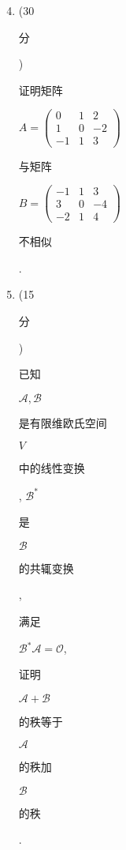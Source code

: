\documentclass[10pt]{article}
\begin{document}
\begin{enumerate}
  \setcounter{enumi}{3}
  \item (30 \begin{CJK}{UTF8}{mj}分\end{CJK}) \begin{CJK}{UTF8}{mj}证明矩阵\end{CJK} $A=\left(\begin{array}{rrr}0 & 1 & 2 \\ 1 & 0 & -2 \\ -1 & 1 & 3\end{array}\right)$ \begin{CJK}{UTF8}{mj}与矩阵\end{CJK} $B=\left(\begin{array}{rrr}-1 & 1 & 3 \\ 3 & 0 & -4 \\ -2 & 1 & 4\end{array}\right)$ \begin{CJK}{UTF8}{mj}不相似\end{CJK}.

  \item (15 \begin{CJK}{UTF8}{mj}分\end{CJK}) \begin{CJK}{UTF8}{mj}已知\end{CJK} $\mathscr{A}, \mathscr{B}$ \begin{CJK}{UTF8}{mj}是有限维欧氏空间\end{CJK} $V$ \begin{CJK}{UTF8}{mj}中的线性变换\end{CJK}, $\mathscr{B}^{*}$ \begin{CJK}{UTF8}{mj}是\end{CJK} $\mathscr{B}$ \begin{CJK}{UTF8}{mj}的共辄变换\end{CJK}, \begin{CJK}{UTF8}{mj}满足\end{CJK} $\mathscr{B}{ }^{*} \mathscr{A}=\mathscr{O}$, \begin{CJK}{UTF8}{mj}证明\end{CJK} $\mathscr{A}+\mathscr{B}$ \begin{CJK}{UTF8}{mj}的秩等于\end{CJK} $\mathscr{A}$ \begin{CJK}{UTF8}{mj}的秩加\end{CJK} $\mathscr{B}$ \begin{CJK}{UTF8}{mj}的秩\end{CJK}.


\end{enumerate}
\end{document}
